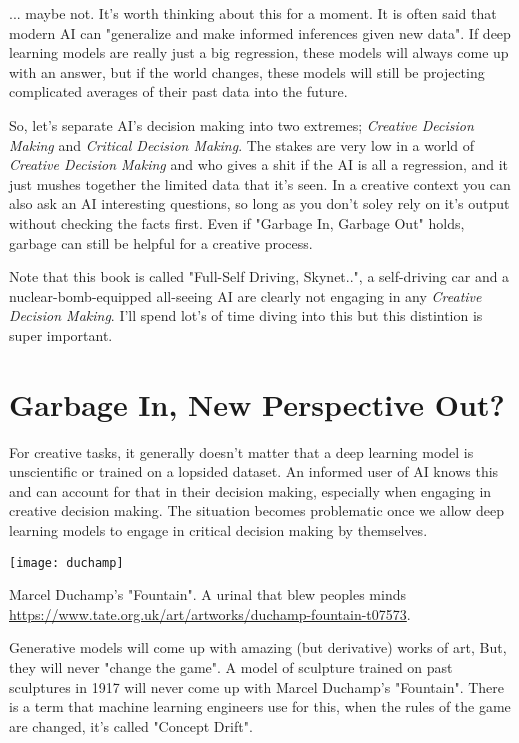 ... maybe not. It's worth thinking about this for a moment. It is often said that modern AI can "generalize and make informed inferences given new data". If deep learning models are really just a big regression, these models will always come up with an answer, but if the world changes, these models will still be projecting complicated averages of their past data into the future. 

So, let's separate AI's decision making into two extremes; \textit{Creative Decision Making} and \textit{Critical Decision Making}. The stakes are very low in a world of \textit{Creative Decision Making} and who gives a shit if the AI is all a regression, and it just mushes together the limited data that it's seen. In a creative context you can also ask an AI interesting questions, so long as you don't soley rely on it's output without checking the facts first. Even if "Garbage In, Garbage Out" holds, garbage can still be helpful for a creative process. 

Note that this book is called "Full-Self Driving, Skynet..", a self-driving car and a nuclear-bomb-equipped all-seeing AI are clearly not engaging in any \textit{Creative Decision Making}. I'll spend lot's of time diving into this but this distintion is super important. 

\section{Garbage In, New Perspective Out?}

For creative tasks, it generally doesn't matter that a deep learning model is unscientific or trained on a lopsided dataset. An informed user of AI knows this and can account for that in their decision making, especially when engaging in creative decision making. The situation becomes problematic once we allow deep learning models to engage in critical decision making by themselves. 

\begin{marginfigure}[-5.5cm]
        \texttt{[image: duchamp]}
        \caption{Marcel Duchamp's "Fountain". A urinal that blew peoples minds \url{https://www.tate.org.uk/art/artworks/duchamp-fountain-t07573}.}
\end{marginfigure}

Generative models will come up with amazing (but derivative) works of art, But, they will never "change the game". A model of sculpture trained on past sculptures in 1917 will never come up with Marcel Duchamp's "Fountain". There is a term that machine learning engineers use for this, when the rules of the game are changed, it's called "Concept Drift".

